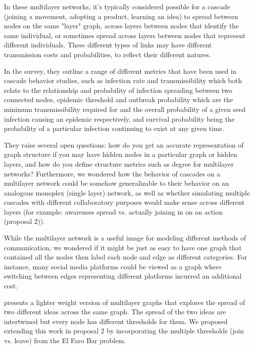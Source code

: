 In these multilayer networks, it's typically considered possible for a cascade (joining a movement, adopting a product, learning an idea) to spread between nodes on the same "layer" graph, across layers between nodes that identify the same individual, or sometimes spread across layers between nodes that represent different individuals. These different types of links may have different transmission costs and probabilities, to reflect their different natures.

In the survey, they outline a range of different metrics that have been used in cascade behavior studies, such as infection rate and transmissibility which both relate to the relationship and probability of infection spreading between two connected nodes, epidemic threshold and outbreak probability which are the minimum transmissibility required for and the overall probability of a given seed infection causing an epidemic respectively, and survival probability being the probability of a particular infection continuing to exist at any given time.

They raise several open questions: how do you get an accurate representation of graph structure if you may have hidden nodes in a particular graph or hidden layers, and how do you define structure metrics such as degree for multilayer networks? Furthermore, we wondered how the behavior of cascades on a multilayer network could be somehow generalizable to their behavior on an analogous monoplex (single layer) network, as well as whether simulating multiple cascades with different collaboratory purposes would make sense across different layers (for example: awareness spread vs. actually joining in on an action (proposal 2)).

While the multilayer network is a useful image for modeling different methods of communication, we wondered if it might be just as easy to have one graph that contained all the nodes then label each node and edge as different categories. For instance, many social media platforms could be viewed as a graph where switching between edges representing different platforms incurred an additional cost. 

\cite{centola} presents a lighter weight version of multilayer graphs that explores the spread of two different ideas across the same graph. The spread of the two ideas are intertwined but every node has different thresholds for them. We proposed extending this work in proposal 2 by incorporating the multiple thresholds (join vs. leave) from the El Faro Bar problem. 

